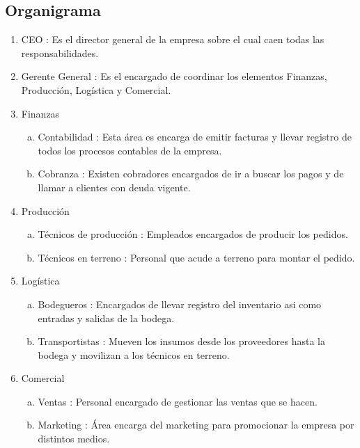 	\subsection{Organigrama}
\newpage
    \begin{enumerate}
    \item CEO :	Es el director general de la empresa sobre el cual caen todas las responsabilidades.
    \item Gerente General : Es el encargado de coordinar los elementos Finanzas, Producción, Logística y Comercial.
    \item Finanzas
    \begin{enumerate}[a)]
        \item Contabilidad : Esta área es encarga de emitir facturas y llevar registro de todos los procesos contables de la empresa.
        \item Cobranza : Existen cobradores encargados de ir a buscar los pagos y de llamar a clientes con deuda vigente.
    \end{enumerate}
    \item Producción
    \begin{enumerate}[a)]
        \item Técnicos de producción : Empleados encargados de producir los pedidos.
        \item Técnicos en terreno : Personal que acude a terreno para montar el pedido.
    \end{enumerate}
    \item Logística
    \begin{enumerate}[a)]
        \item Bodegueros : Encargados de llevar registro del inventario asi como entradas y salidas de la bodega.
        \item Transportistas : Mueven los insumos desde los proveedores hasta la bodega y movilizan a los técnicos en terreno.
    \end{enumerate}
    \item Comercial
    \begin{enumerate}[a)]
        \item Ventas : Personal encargado de gestionar las ventas que se hacen.
        \item Marketing : Área encarga del marketing para promocionar la empresa por distintos medios.
    \end{enumerate}
    \end{enumerate}
